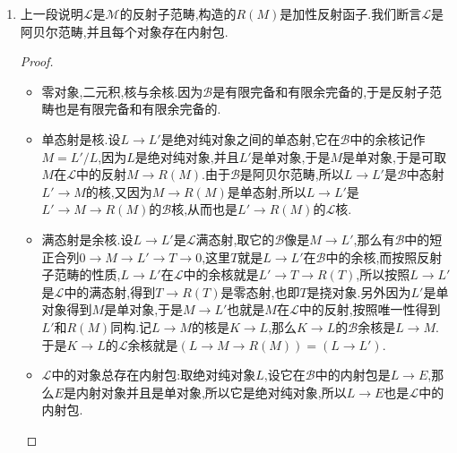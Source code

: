 \begin{enumerate}
\begin{proof}
    	我们解释过$F\to\mathscr{N}(F)$的核是挠对象,所以这里$T$是挠对象.另外按照$\mathscr{N}(F)$是单对象,得到$R$是$E$的纯子对象,但是$E$是绝对纯的,所以$R$也是绝对纯的.把上一条用在第一行上得到结论.
    \end{proof}
    \item 上一段说明$\mathscr{L}$是$\mathscr{M}$的反射子范畴,构造的$R(M)$是加性反射函子.我们断言$\mathscr{L}$是阿贝尔范畴,并且每个对象存在内射包.
    \begin{proof}
    	\begin{itemize}
    		\item 零对象,二元积,核与余核.因为$\mathscr{B}$是有限完备和有限余完备的,于是反射子范畴也是有限完备和有限余完备的.
    		\item 单态射是核.设$L\to L'$是绝对纯对象之间的单态射,它在$\mathscr{B}$中的余核记作$M=L'/L$,因为$L$是绝对纯对象,并且$L'$是单对象,于是$M$是单对象,于是可取$M$在$\mathscr{L}$中的反射$M\to R(M)$.由于$\mathscr{B}$是阿贝尔范畴,所以$L\to L'$是$\mathscr{B}$中态射$L'\to M$的核,又因为$M\to R(M)$是单态射,所以$L\to L'$是$L'\to M\to R(M)$的$\mathscr{B}$核,从而也是$L'\to R(M)$的$\mathscr{L}$核.
    		\item 满态射是余核.设$L\to L'$是$\mathscr{L}$满态射,取它的$\mathscr{B}$像是$M\to L'$,那么有$\mathscr{B}$中的短正合列$0\to M\to L'\to T\to0$,这里$T$就是$L\to L'$在$\mathscr{B}$中的余核,而按照反射子范畴的性质,$L\to L'$在$\mathscr{L}$中的余核就是$L'\to T\to R(T)$,所以按照$L\to L'$是$\mathscr{L}$中的满态射,得到$T\to R(T)$是零态射,也即$T$是挠对象.另外因为$L'$是单对象得到$M$是单对象,于是$M\to L'$也就是$M$在$\mathscr{L}$中的反射,按照唯一性得到$L'$和$R(M)$同构.记$L\to M$的核是$K\to L$,那么$K\to L$的$\mathscr{B}$余核是$L\to M$.于是$K\to L$的$\mathscr{L}$余核就是$\left(L\to M\to R(M)\right)=\left(L\to L'\right)$.
    		\item $\mathscr{L}$中的对象总存在内射包:取绝对纯对象$L$,设它在$\mathscr{B}$中的内射包是$L\to E$,那么$E$是内射对象并且是单对象,所以它是绝对纯对象,所以$L\to E$也是$\mathscr{L}$中的内射包.
    	\end{itemize}
    \end{proof}
\end{enumerate}

